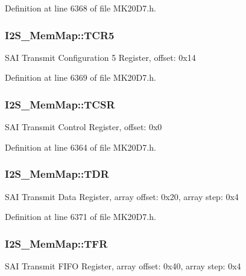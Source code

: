 Definition at line 6368 of file M\+K20\+D7.\+h.

\subsubsection[{\texorpdfstring{T\+C\+R5}{TCR5}}]{ I2\+S\+\_\+\+Mem\+Map\+::\+T\+C\+R5}\hypertarget{struct_i2_s___mem_map_ac559d60e95112859062a4a5427ebbc61}{}\label{struct_i2_s___mem_map_ac559d60e95112859062a4a5427ebbc61}
S\+AI Transmit Configuration 5 Register, offset\+: 0x14 

Definition at line 6369 of file M\+K20\+D7.\+h.

\subsubsection[{\texorpdfstring{T\+C\+SR}{TCSR}}]{ I2\+S\+\_\+\+Mem\+Map\+::\+T\+C\+SR}\hypertarget{struct_i2_s___mem_map_a6a6cb435306769616551657a370e1aec}{}\label{struct_i2_s___mem_map_a6a6cb435306769616551657a370e1aec}
S\+AI Transmit Control Register, offset\+: 0x0 

Definition at line 6364 of file M\+K20\+D7.\+h.

\subsubsection[{\texorpdfstring{T\+DR}{TDR}}]{ I2\+S\+\_\+\+Mem\+Map\+::\+T\+DR}\hypertarget{struct_i2_s___mem_map_a3ab91308cebaa242a4839dfb89527ea1}{}\label{struct_i2_s___mem_map_a3ab91308cebaa242a4839dfb89527ea1}
S\+AI Transmit Data Register, array offset\+: 0x20, array step\+: 0x4 

Definition at line 6371 of file M\+K20\+D7.\+h.

\subsubsection[{\texorpdfstring{T\+FR}{TFR}}]{ I2\+S\+\_\+\+Mem\+Map\+::\+T\+FR}\hypertarget{struct_i2_s___mem_map_ad82f743967a6768d28b136ebe71ab6ac}{}\label{struct_i2_s___mem_map_ad82f743967a6768d28b136ebe71ab6ac}
S\+AI Transmit F\+I\+FO Register, array offset\+: 0x40, array step\+: 0x4 

